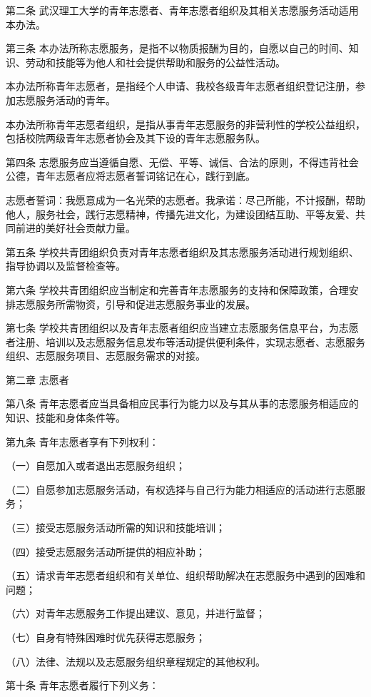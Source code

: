 \documentclass[UTF8,12pt,a4paper]{report}
\begin{document}
第二条 武汉理工大学的青年志愿者、青年志愿者组织及其相关志愿服务活动适用本办法。

第三条 本办法所称志愿服务，是指不以物质报酬为目的，自愿以自己的时间、知识、劳动和技能等为他人和社会提供帮助和服务的公益性活动。

本办法所称青年志愿者，是指经个人申请、我校各级青年志愿者组织登记注册，参加志愿服务活动的青年。

本办法所称青年志愿者组织，是指从事青年志愿服务的非营利性的学校公益组织，包括校院两级青年志愿者协会及其下设的青年志愿服务队。

第四条 志愿服务应当遵循自愿、无偿、平等、诚信、合法的原则，不得违背社会公德，青年志愿者应将志愿者誓词铭记在心，践行到底。

志愿者誓词：我愿意成为一名光荣的志愿者。我承诺：尽己所能，不计报酬，帮助他人，服务社会，践行志愿精神，传播先进文化，为建设团结互助、平等友爱、共同前进的美好社会贡献力量。

第五条 学校共青团组织负责对青年志愿者组织及其志愿服务活动进行规划组织、指导协调以及监督检查等。

第六条 学校共青团组织应当制定和完善青年志愿服务的支持和保障政策，合理安排志愿服务所需物资，引导和促进志愿服务事业的发展。

第七条 学校共青团组织以及青年志愿者组织应当建立志愿服务信息平台，为志愿者注册、培训以及志愿服务信息发布等活动提供便利条件，实现志愿者、志愿服务组织、志愿服务项目、志愿服务需求的对接。

 

第二章  志愿者

第八条 青年志愿者应当具备相应民事行为能力以及与其从事的志愿服务相适应的知识、技能和身体条件等。

第九条 青年志愿者享有下列权利：

（一）自愿加入或者退出志愿服务组织；

（二）自愿参加志愿服务活动，有权选择与自己行为能力相适应的活动进行志愿服务；

（三）接受志愿服务活动所需的知识和技能培训；

（四）接受志愿服务活动所提供的相应补助；

（五）请求青年志愿者组织和有关单位、组织帮助解决在志愿服务中遇到的困难和问题；

（六）对青年志愿服务工作提出建议、意见，并进行监督；

（七）自身有特殊困难时优先获得志愿服务；

（八）法律、法规以及志愿服务组织章程规定的其他权利。

第十条 青年志愿者履行下列义务：
\end{document}
